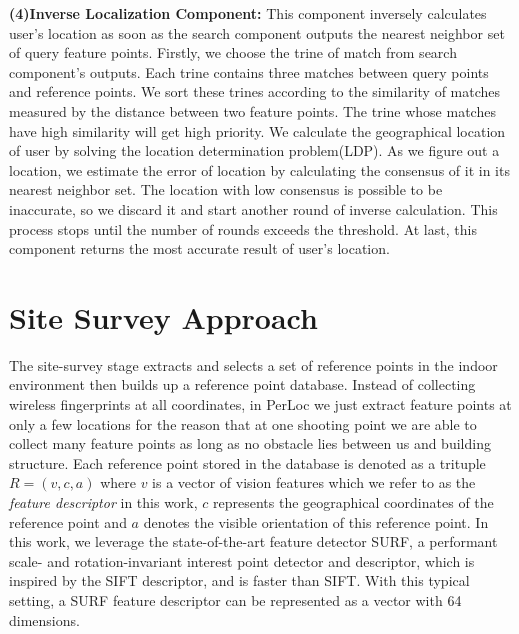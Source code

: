 \documentclass[10pt, conference, letterpaper]{IEEEtran}
\def\eg{\textit{e.g.}\xspace}
\def\oursystem{\xspace{PerLoc}\xspace}
\begin{document}
\textbf{(4)Inverse Localization Component:}
This component inversely calculates user's location as soon as the search component outputs the nearest neighbor set of query feature points. Firstly, we choose the trine of match from search component's outputs. Each trine contains three matches between query points and reference points. We sort these trines according to the similarity of matches measured by the distance between two feature points. The trine whose matches have high similarity will get high priority. We calculate the geographical location of user by solving the location determination problem(LDP). As we figure out a location, we estimate the error of location by calculating the consensus of it in its nearest neighbor set. The location with low consensus is possible to be inaccurate, so we discard it and start another round of inverse calculation. This process stops until the number of rounds exceeds the threshold. At last, this component returns the most accurate result of user's location.

\section{Site Survey Approach}
\label{sec:site}
%

The site-survey stage extracts and selects a set of reference points in the indoor environment then builds up a reference point database. Instead of collecting wireless fingerprints at all coordinates, in \oursystem we just extract feature points at only a few locations for the reason that at one shooting point we are able to collect many feature points as long as no obstacle lies between us and building structure. Each reference point stored in the database is denoted as a trituple $R = (v, c, a)$ where $v$ is a vector of vision features which we refer to as the \emph{feature descriptor} in this work, $c$ represents the geographical coordinates of the reference point and $a$ denotes the visible orientation of this reference point.
In this work, we leverage the state-of-the-art feature detector SURF\cite{bay2006surf}, a performant scale- and rotation-invariant interest point detector and descriptor, which is inspired by the SIFT descriptor\cite{lowe2004distinctive}, and is faster than SIFT. With this typical setting, a SURF feature descriptor can be represented as a vector with 64 dimensions.
\end{document}
